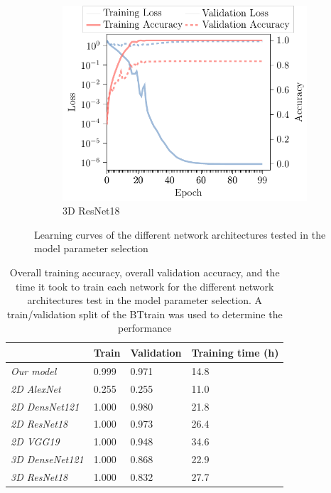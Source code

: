 \begin{subappendices}
\begin{figure}
\begin{subfigure}[t]{\modelplotwidth}
    \includegraphics[width=\textwidth]{Figures/Appendix/ResNet_3D.pdf}
    \caption{3D ResNet18}\label{fig:ResNet3D}
\end{subfigure}

\caption{Learning curves of the different network architectures tested in the model parameter selection}\label{fig:modellearningcurves}
\end{figure}

\begin{table}[H]
 \centering
  \begin{tabular}{L{2.5cm}C{2cm}C{2cm}C{2cm}}
      \toprule
& \textbf{Train} & \textbf{Validation} & \textbf{Training time (h)}\\
    \midrule
    \textit{Our model} & 0.999 & 0.971 & 14.8\\
    \textit{2D AlexNet} & 0.255 & 0.255 & 11.0\\
    \textit{2D DensNet121} & 1.000 & 0.980 & 21.8\\
    \textit{2D ResNet18} & 1.000 & 0.973 & 26.4\\
    \textit{2D VGG19} & 1.000 & 0.948 & 34.6\\
    \textit{3D DenseNet121} & 1.000 & 0.868 & 22.9\\
    \textit{3D ResNet18} & 1.000 & 0.832 & 27.7\\
  \bottomrule
  \end{tabular}
  \caption{Overall training accuracy, overall validation accuracy, and the time it took to train each network for the different network architectures test in the model parameter selection.
  A train/validation split of the \gls{BTtrain} was used to determine the performance}\label{tab:modelaccuracies}


\end{table}
\end{subappendices}
